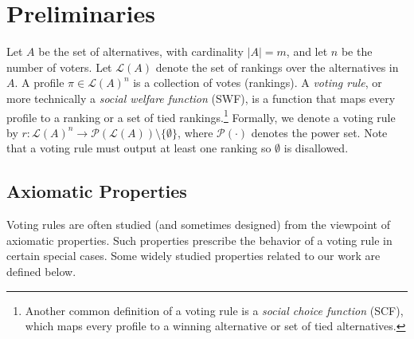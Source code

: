 \documentclass[prodmode]{acmsmall-ec14}
\newcommand{\calL}{{\mathcal{L}}}
\newcommand{\rank}{{\calL(A)}}
\newcommand{\calP}{{\mathcal{P}}}
\begin{document}
\section{Preliminaries}
\label{sec:prelim}
Let $A$ be the set of alternatives, with cardinality $|A| = m$, and let $n$ be the number of voters. Let $\rank$ denote the set of rankings over the alternatives in $A$. A profile $\pi \in \rank^n$ is a collection of votes (rankings). A \emph{voting rule}, or more technically a \emph{social welfare function} (SWF), is a function that maps every profile to a ranking or a set of tied rankings.\footnote{Another common definition of a voting rule is a \emph{social choice function} (SCF), which maps every profile to a winning alternative or set of tied alternatives.} Formally, we denote a voting rule by $r : \rank^n \rightarrow \calP(\rank)\setminus\{\emptyset\}$, where $\calP(\cdot)$ denotes the power set. Note that a voting rule must output at least one ranking so $\emptyset$ is disallowed. 


\subsection*{Axiomatic Properties} Voting rules are often studied (and sometimes designed) from the viewpoint of axiomatic properties. Such properties prescribe the behavior of a voting rule in certain special cases. Some widely studied properties related to our work are defined below. 
\end{document}
